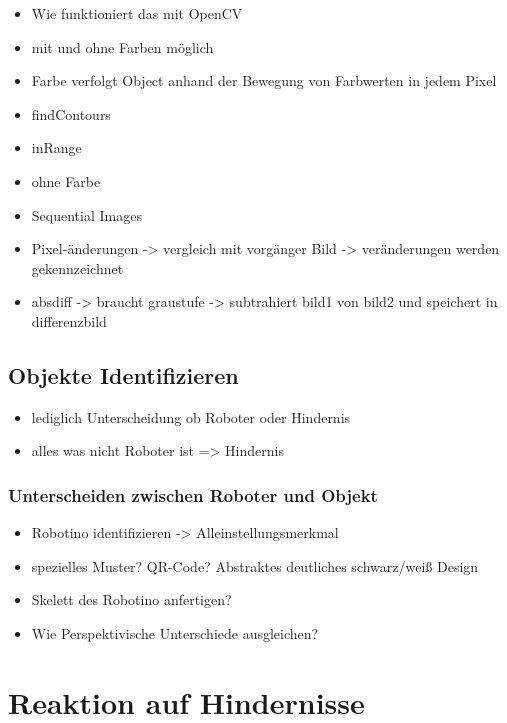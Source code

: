 				\begin{itemize}
				\item Wie funktioniert das mit OpenCV
				\item mit und ohne Farben möglich
				\item Farbe verfolgt Object anhand der Bewegung von Farbwerten in jedem Pixel
				\item findContours
				\item inRange
				\item ohne Farbe
				\item Sequential Images
				\item Pixel-änderungen -> vergleich mit vorgänger Bild -> veränderungen werden gekennzeichnet
				\item absdiff -> braucht graustufe -> subtrahiert bild1 von bild2 und speichert in differenzbild
				
				\end{itemize}
		\section{Objekte Identifizieren}
		\begin{itemize}
		\item lediglich Unterscheidung ob Roboter oder Hindernis
		\item alles was nicht Roboter ist => Hindernis
		\end{itemize}
			\subsection{Unterscheiden zwischen Roboter und Objekt}
			\begin{itemize}
			\item Robotino identifizieren -> Alleinstellungsmerkmal
			\item spezielles Muster? QR-Code? Abstraktes deutliches schwarz/weiß Design
			\item Skelett des Robotino anfertigen?
			\item Wie Perspektivische Unterschiede ausgleichen?
			\end{itemize}
		
	\chapter{Reaktion auf Hindernisse}
